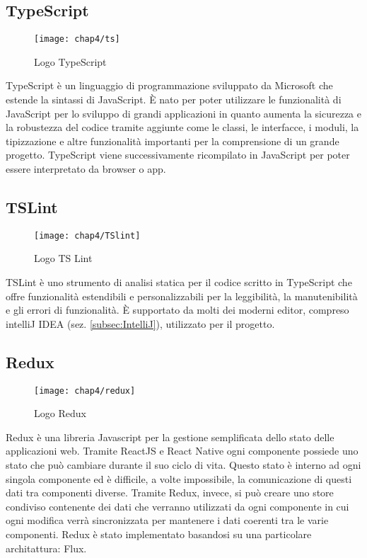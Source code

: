\subsection{TypeScript}
\begin{figure}[H] 
	\centering
	\texttt{[image: chap4/ts]}
	\caption{Logo TypeScript}
\end{figure}
TypeScript è un linguaggio di programmazione sviluppato da Microsoft che 
estende la sintassi di JavaScript.  È nato per poter utilizzare le funzionalità di 
JavaScript per lo sviluppo di grandi applicazioni in quanto aumenta la 
sicurezza e la robustezza del codice tramite aggiunte come le classi, le 
interfacce, i moduli, la tipizzazione e altre funzionalità importanti per la 
comprensione di un grande progetto. 
TypeScript viene successivamente ricompilato in JavaScript per poter essere 
 interpretato da browser o app.

\subsection{TSLint}
\begin{figure}[H] 
	\centering
	\texttt{[image: chap4/TSlint]}
	\caption{Logo TS Lint}
\end{figure}
TSLint è uno strumento di analisi statica per il codice scritto in TypeScript che offre funzionalità estendibili e personalizzabili per la leggibilità, la manutenibilità e gli errori di funzionalità. È supportato da molti dei moderni editor, compreso intelliJ IDEA (sez. \ref{subsec:IntelliJ}), utilizzato per il progetto.

\subsection{Redux}
\begin{figure}[H] 
	\centering
	\texttt{[image: chap4/redux]}
	\caption{Logo Redux}
\end{figure}
Redux è una libreria Javascript per la gestione semplificata dello stato delle applicazioni web. Tramite ReactJS e React Native ogni componente possiede uno stato che può cambiare durante il suo ciclo di vita. Questo stato è interno ad ogni singola componente ed è difficile, a volte impossibile, la comunicazione di questi dati tra componenti diverse. 
Tramite Redux, invece, si può creare uno store condiviso contenente dei dati che verranno utilizzati da ogni componente in cui ogni modifica verrà sincronizzata per mantenere i dati coerenti tra le varie componenti.
Redux è stato implementato basandosi su una particolare architattura: Flux.

